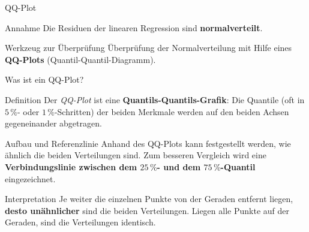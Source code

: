 \documentclass[aspectratio=169,11pt]{beamer}
\begin{document}
\begin{frame}{QQ-Plot}
  \begin{block}{Annahme}
    Die Residuen der linearen Regression sind \textbf{normalverteilt}.
  \end{block}

  \begin{exampleblock}{Werkzeug zur Überprüfung}
    Überprüfung der Normalverteilung mit Hilfe eines \textbf{QQ-Plots}
    (Quantil-Quantil-Diagramm).
  \end{exampleblock}
\end{frame}

\begin{frame}{Was ist ein QQ-Plot?}
  \begin{block}{Definition}
    Der \emph{QQ-Plot} ist eine \textbf{Quantils-Quantils-Grafik}: Die
    Quantile (oft in $5\,\%$- oder $1\,\%$-Schritten) der beiden
    Merkmale werden auf den beiden Achsen gegeneinander abgetragen.
  \end{block}

  \begin{block}{Aufbau und Referenzlinie}
    Anhand des QQ-Plots kann festgestellt werden, wie ähnlich die
    beiden Verteilungen sind. Zum besseren Vergleich wird eine
    \textbf{Verbindungslinie zwischen dem $25\,\%$- und dem $75\,\%$-Quantil}
    eingezeichnet.
  \end{block}

  \begin{alertblock}{Interpretation}
    Je weiter die einzelnen Punkte von der Geraden entfernt liegen,
    \textbf{desto unähnlicher} sind die beiden Verteilungen. Liegen
    alle Punkte auf der Geraden, sind die Verteilungen identisch.
  \end{alertblock}
\end{frame}
\end{document}
